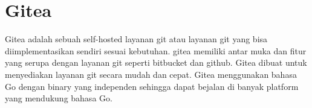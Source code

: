    		\section{Gitea}
   			Gitea adalah sebuah self-hosted layanan git atau layanan git  yang bisa diimplementasikan sendiri sesuai kebutuhan. gitea memiliki antar muka dan fitur yang serupa dengan layanan git seperti bitbucket dan github. Gitea dibuat untuk menyediakan layanan git secara mudah dan cepat. Gitea menggunakan bahasa Go dengan binary yang independen sehingga dapat bejalan di banyak platform yang mendukung bahasa Go.
       		
        	
        
